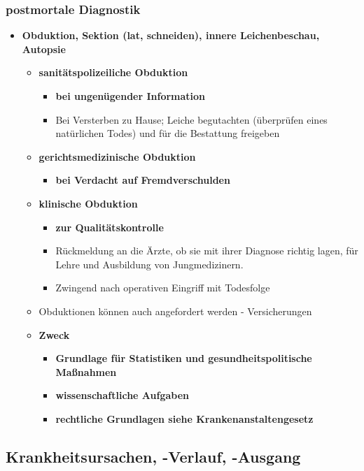 \subsubsection{postmortale Diagnostik}
	\begin{itemize}
		\item \textbf{Obduktion, Sektion (lat, schneiden), innere Leichenbeschau, Autopsie}
			\begin{itemize}
				\item \textbf{sanitätspolizeiliche Obduktion}
					\begin{itemize}
						\item \textbf{bei ungenügender Information}
						\item Bei Versterben zu Hause; Leiche begutachten (überprüfen eines natürlichen Todes) und für die Bestattung freigeben
					\end{itemize}
				\item \textbf{gerichtsmedizinische Obduktion}
					\begin{itemize}
						\item \textbf{bei Verdacht auf Fremdverschulden}
					\end{itemize}
				\item \textbf{klinische Obduktion}
					\begin{itemize}
						\item \textbf{zur Qualitätskontrolle}
						\item Rückmeldung an die Ärzte, ob sie mit ihrer Diagnose richtig lagen, für Lehre und Ausbildung von Jungmedizinern.
						\item Zwingend nach operativen Eingriff mit Todesfolge
					\end{itemize}
				\item Obduktionen können auch angefordert werden - Versicherungen
				\item \textbf{Zweck}
					\begin{itemize}
						\item \textbf{Grundlage für Statistiken und gesundheitspolitische Maßnahmen}
						\item \textbf{wissenschaftliche Aufgaben}
						\item \textbf{rechtliche Grundlagen siehe Krankenanstaltengesetz}
					\end{itemize}
			\end{itemize}
	\end{itemize}

\subsection{Krankheitsursachen, -Verlauf, -Ausgang}
